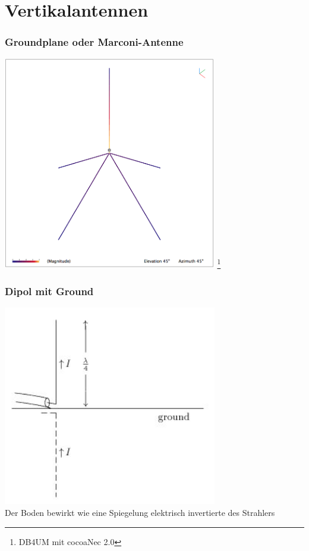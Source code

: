 \section*{Vertikalantennen}

\begin{frame}
  \frametitle{Groundplane oder Marconi-Antenne}
  \begin{center}
    \includegraphics[width=0.7\textwidth]{a09/GP-DB4UM.png}
    \footnote{\tiny DB4UM mit cocoaNec 2.0}
  \end{center}
\end{frame}

\begin{frame}
  \frametitle{Dipol mit Ground}
  \begin{center}
    \includegraphics[width=0.7\textwidth]{a09/A6-3EN.jpg}
    \tiny \hyperlink{refs}{\cite{wm}} \\[2em] \large
    Der Boden bewirkt wie eine Spiegelung elektrisch invertierte des Strahlers
  \end{center}
\end{frame}

